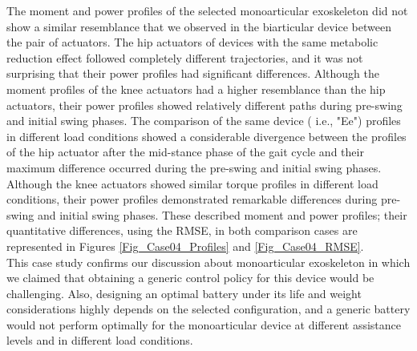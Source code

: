 \documentclass[10pt,letterpaper]{article}
\begin{document}
The moment and power profiles of the selected monoarticular exoskeleton did not show a similar resemblance that we observed in the biarticular device between the pair of actuators. The hip actuators of devices with the same metabolic reduction effect followed completely different trajectories, and it was not surprising that their power profiles had significant differences. Although the moment profiles of the knee actuators had a higher resemblance than the hip actuators, their power profiles showed relatively different paths during pre-swing and initial swing phases. The comparison of the same device ( i.e., "Ee") profiles in different load conditions showed a considerable divergence between the profiles of the hip actuator after the mid-stance phase of the gait cycle and their maximum difference occurred during the pre-swing and initial swing phases. Although the knee actuators showed similar torque profiles in different load conditions, their power profiles demonstrated remarkable differences during pre-swing and initial swing phases. These described moment and power profiles; their quantitative differences, using the RMSE, in both comparison cases are represented in Figures \ref{Fig_Case04_Profiles} and \ref{Fig_Case04_RMSE}.\\
This case study confirms our discussion about monoarticular exoskeleton in which we claimed that obtaining a generic control policy for this device would be challenging. Also, designing an optimal battery under its life and weight considerations highly depends on the selected configuration, and a generic battery would not perform optimally for the monoarticular device at different assistance levels and in different load conditions.
\end{document}
